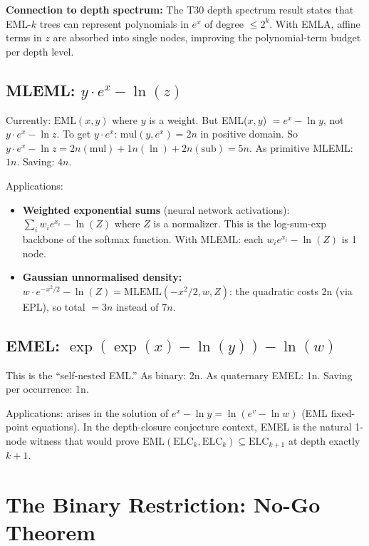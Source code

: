 \documentclass[11pt]{article}
\begin{document}
\noindent \textbf{Connection to depth spectrum:}
The T30 depth spectrum result states that EML-$k$ trees can represent
polynomials in $e^x$ of degree $\leq 2^k$. With EMLA, affine terms in $z$
are absorbed into single nodes, improving the polynomial-term budget per
depth level.

\subsection{MLEML: $y \cdot e^x - \ln(z)$}

Currently: $\mathrm{EML}(x,y)$ where $y$ is a weight. But EML($x,y$) $= e^x - \ln y$,
not $y \cdot e^x - \ln z$. To get $y \cdot e^x$: $\mathrm{mul}(y, e^x) = 2n$ in positive domain.
So $y \cdot e^x - \ln z = 2n(\mathrm{mul}) + 1n(\ln) + 2n(\mathrm{sub}) = 5n$.
As primitive MLEML: $1n$. Saving: $4n$.

Applications:
\begin{itemize}
  \item \textbf{Weighted exponential sums} (neural network activations):
        $\sum_i w_i e^{x_i} - \ln(Z)$ where $Z$ is a normalizer.
        This is the log-sum-exp backbone of the softmax function.
        With MLEML: each $w_i e^{x_i} - \ln(Z)$ is 1 node.
  \item \textbf{Gaussian unnormalised density:}
        $w \cdot e^{-x^2/2} - \ln(Z) = \mathrm{MLEML}(-x^2/2, w, Z)$:
        the quadratic costs 2n (via EPL), so total $= 3n$ instead of $7n$.
\end{itemize}

\subsection{EMEL: $\exp(\exp(x) - \ln(y)) - \ln(w)$}

This is the ``self-nested EML.'' As binary: 2n. As quaternary EMEL: 1n.
Saving per occurrence: 1n.

Applications: arises in the solution of $e^x - \ln y = \ln(e^v - \ln w)$
(EML fixed-point equations). In the depth-closure conjecture context,
EMEL is the natural 1-node witness that would prove
$\mathrm{EML}(\mathrm{ELC}_k, \mathrm{ELC}_k) \subseteq \mathrm{ELC}_{k+1}$
at depth exactly $k+1$.

\section{The Binary Restriction: No-Go Theorem}
\label{sec:nogo}
\end{document}
